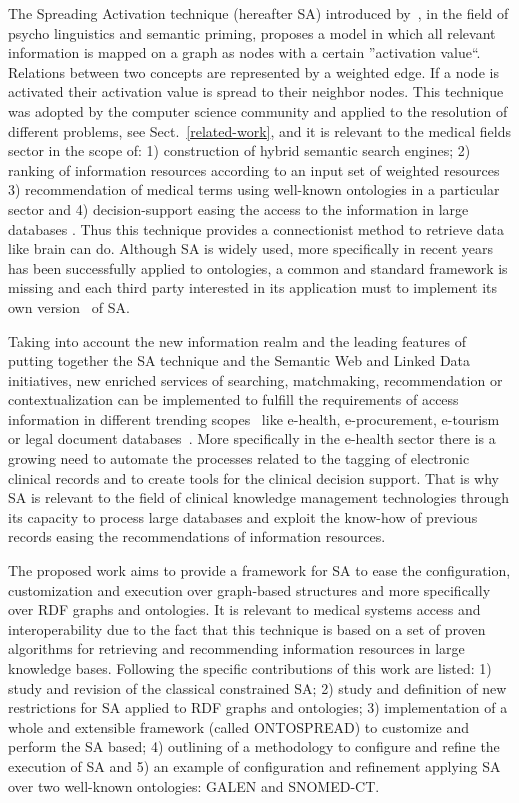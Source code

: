 The Spreading Activation technique (hereafter SA) introduced by~\cite{Collins_Loftus_1975}, in the field of 
psycho linguistics and semantic priming, proposes a model in which all relevant information is mapped
on a graph as nodes with a certain ''activation value``. Relations between two concepts
are represented by a weighted edge. If a node is activated their activation value is spread
to their neighbor nodes. This technique was adopted by the computer science community and applied
to the resolution of different problems, see Sect.~\ref{related-work}, and it is relevant to
the medical fields sector in the scope of: 1) construction of hybrid semantic search engines;  2) ranking of
information resources according to an input set of weighted resources 3) recommendation of medical terms using
well-known ontologies in a particular sector and 4) decision-support easing the access to the information
in large databases . Thus this technique provides a connectionist method to retrieve data like brain can do. 
Although SA is widely used, more specifically in recent years has been successfully applied 
to ontologies, a common and standard framework is missing and each third party interested in its application
 must to implement its own version~\cite{SpreadingLarkc} of SA.

Taking into account the new information realm and the leading features of putting together 
the SA technique and the Semantic Web and Linked Data initiatives, new enriched services of searching, 
matchmaking, recommendation or contextualization can be implemented to fulfill the requirements
of access information in different trending scopes~\cite{Lytras:jucs_17_9:software_technologies_in_knowledge} like e-health, e-procurement, e-tourism or legal 
document databases~\cite{bopaEstonia}. More specifically in the e-health sector there 
is a growing need to automate the processes related to the tagging of electronic clinical records and to create 
tools for the clinical decision support. That is why SA is relevant to the field of clinical knowledge management 
technologies through its capacity to process large databases and exploit the know-how
of previous records easing the recommendations of information resources.


The proposed work aims to provide a framework for SA to ease the configuration, customization 
and execution over graph-based structures and more specifically over RDF graphs and ontologies. It is relevant
to medical systems access and interoperability due to the fact that this technique is based on
a set of proven algorithms for retrieving and recommending information resources in large knowledge bases. 
Following the specific contributions of this work are listed: 1) study and revision of the classical constrained SA;
2) study and definition of new restrictions for SA applied to RDF graphs and ontologies; 
3) implementation of a whole and extensible framework (called ONTOSPREAD) to customize 
and perform the SA based; 4) outlining of a methodology to configure and refine the execution of SA and 
5) an example of configuration and refinement applying SA over two well-known ontologies: GALEN and SNOMED-CT.


